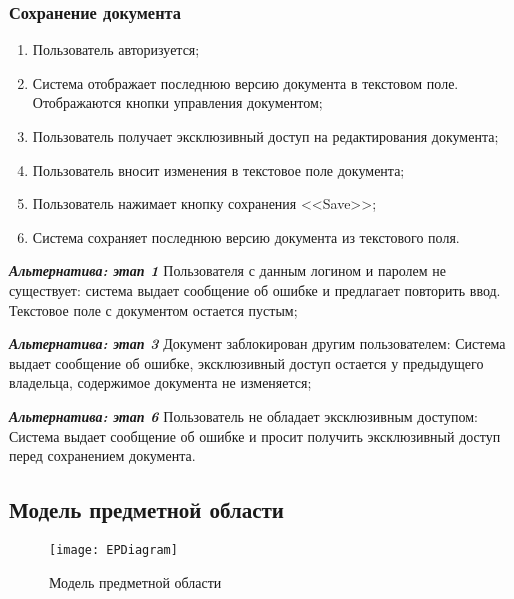  	\subsubsection{Сохранение документа}
 	\begin{enumerate}
 		\item Пользователь авторизуется;
 		\item Система отображает последнюю версию документа в текстовом поле. Отображаются кнопки управления документом;
 		\item Пользователь получает эксклюзивный доступ на редактирования документа;
 		\item Пользователь вносит изменения в текстовое поле документа;
 		\item Пользователь нажимает кнопку сохранения <<Save>>;
 		\item Система сохраняет последнюю версию документа из текстового поля.
 	\end{enumerate}
 	
 	\textbf{\textit{Альтернатива: этап 1}} Пользователя с данным логином и паролем не существует: система выдает сообщение об ошибке и предлагает повторить ввод. Текстовое поле с документом остается пустым;
 	
 	\textbf{\textit{Альтернатива: этап 3}} Документ заблокирован другим пользователем: Система выдает сообщение об ошибке, эксклюзивный доступ остается у предыдущего владельца, содержимое документа не изменяется;
 	
 	\textbf{\textit{Альтернатива: этап 6}} Пользователь не обладает эксклюзивным доступом: Система выдает сообщение об ошибке и просит получить эксклюзивный доступ перед сохранением документа.
	
\subsection{Модель предметной области}
	\begin{figure}[H]
		\centering
		\texttt{[image: EPDiagram]}
		\caption{Модель предметной области}
		\label{fig:class_ob}
	\end{figure}